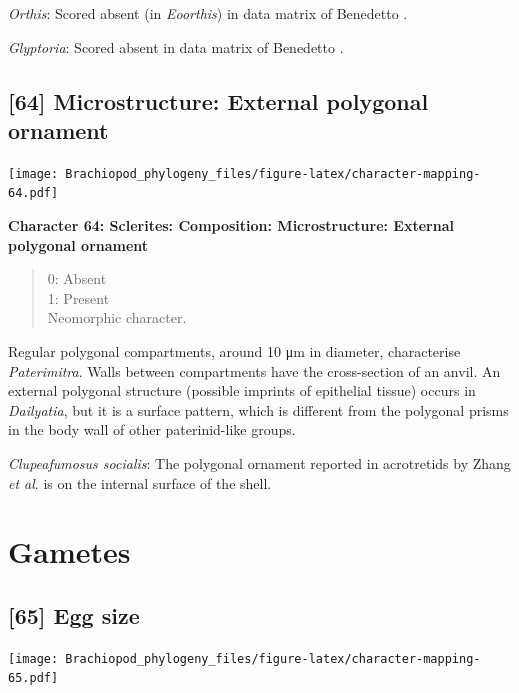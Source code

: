 \documentclass[]{book}
\theoremstyle{definition}
\theoremstyle{definition}
\theoremstyle{definition}
\theoremstyle{remark}
\begin{document}
\emph{Orthis}: Scored absent (in \emph{Eoorthis}) in data matrix of
Benedetto \citeyearpar{Benedetto2009iChaniella}.

\emph{Glyptoria}: Scored absent in data matrix of Benedetto
\citeyearpar{Benedetto2009iChaniella}.

\hypertarget{microstructure-external-polygonal-ornament}{%
\subsection*{{[}64{]} Microstructure: External polygonal
ornament}\label{microstructure-external-polygonal-ornament}}

\texttt{[image: Brachiopod\_phylogeny\_files/figure-latex/character-mapping-64.pdf]}

\textbf{Character 64: Sclerites: Composition: Microstructure: External
polygonal ornament}

\begin{quote}
0: Absent\\
1: Present\\
Neomorphic character.
\end{quote}

Regular polygonal compartments, around 10 μm in diameter, characterise
\emph{Paterimitra}. Walls between compartments have the cross-section of
an anvil. An external polygonal structure (possible imprints of
epithelial tissue) occurs in \emph{Dailyatia}, but it is a surface
pattern, which is different from the polygonal prisms in the body wall
of other paterinid-like groups.

\emph{Clupeafumosus socialis}: The polygonal ornament reported in
acrotretids by Zhang \emph{et al}. \citeyearpar{Zhang2016Epithelialcell}
is on the internal surface of the shell.

\hypertarget{gametes}{%
\section{Gametes}\label{gametes}}

\hypertarget{egg-size}{%
\subsection*{{[}65{]} Egg size}\label{egg-size}}

\texttt{[image: Brachiopod\_phylogeny\_files/figure-latex/character-mapping-65.pdf]}
\end{document}
